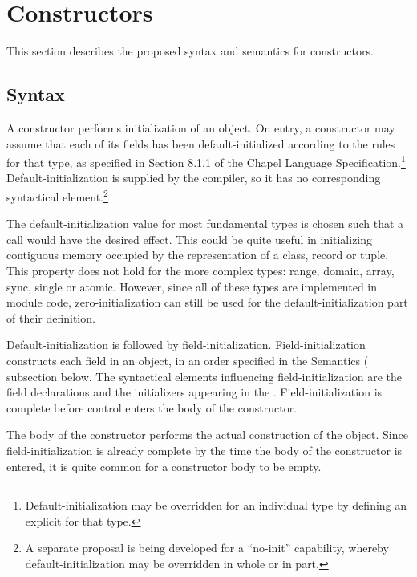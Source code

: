 \section{Constructors}
\label{Constructors}

This section describes the proposed syntax and semantics for constructors.

\subsection{Syntax}

A constructor performs initialization of an object.  On entry, a
constructor may assume that each of its fields has been default-initialized according to the
rules for that type, as specified in Section 8.1.1 of the Chapel Language
Specification.\footnote{Default-initialization may be overridden for an individual type by
  defining an explicit  for that type.}
Default-initialization is supplied by the compiler, so it has no corresponding syntactical
element.\footnote{A separate proposal is being developed for a ``no-init'' capability,
  whereby default-initialization may be overridden in whole or in part.}

\begin{note}
The default-initialization value for most fundamental types is chosen such that a 
 call would have the desired effect.  This could be quite useful in
initializing contiguous memory occupied by the representation of a class, record or tuple.
This property does not hold for the more complex types: range, domain, array, sync, single
or atomic.  However, since all of these types are implemented in module code,
zero-initialization can still be used for the default-initialization part of their
definition.
\end{note}

Default-initialization is followed by field-initialization.  Field-initialization
constructs each field in an object, in an order specified in the Semantics
( subsection below.  The syntactical elements influencing
field-initialization are the field declarations and the initializers appearing in the
.  Field-initialization is complete before control enters the body
of the constructor.

The body of the constructor performs the actual construction of the object.  Since
field-initialization is already complete by the time the body of the constructor is
entered, it is quite common for a constructor body to be empty.

